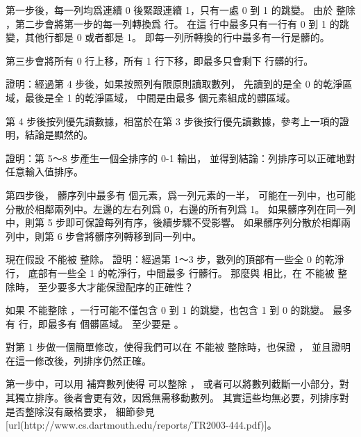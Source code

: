 \startANSWER
第一步後，每一列均爲連續 0 後緊跟連續 1，只有一處 0 到 1 的跳變。
由於  整除 ，第二步會將第一步的每一列轉換爲  行。
在這  行中最多只有一行有 0 到 1 的跳變，其他行都是 0 或者都是 1。
即每一列所轉換的行中最多有一行是髒的。

第三步會將所有 0 行上移，所有 1 行下移，即最多只會剩下  行髒的行。
\stopANSWER

\startitem
證明：經過第 4 步後，如果按照列有限原則讀取數列，
先讀到的是全 0 的乾淨區域，最後是全 1 的乾淨區域，
中間是由最多  個元素組成的髒區域。
\stopitem

\startANSWER
第 4 步後按列優先讀數據，相當於在第 3 步後按行優先讀數據，參考上一項的證明，結論是顯然的。
\stopANSWER

\startitem
證明：第 5～8 步產生一個全排序的 0-1 輸出，
並得到結論：列排序可以正確地對任意輸入值排序。
\stopitem

\startANSWER
第四步後， 髒序列中最多有  個元素，爲一列元素的一半，
可能在一列中，也可能分散於相鄰兩列中。左邊的左右列爲 0，右邊的所有列爲 1。
如果髒序列在同一列中，則第 5 步即可保證每列有序，後續步驟不受影響。
如果髒序列分散於相鄰兩列中，則第 6 步會將髒序列轉移到同一列中。
\stopANSWER

\startitem
現在假設  不能被  整除。
證明：經過第 1～3 步，數列的頂部有一些全 0 的乾淨行，
底部有一些全 1 的乾淨行，中間最多  行髒行。
那麼與  相比，在  不能被  整除時，  至少要多大才能保證配序的正確性？
\stopitem

\startANSWER
如果  不能整除 ，一行可能不僅包含 0 到 1 的跳變，也包含 1 到 0 的跳變。
最多有   行，即最多有  個髒區域。
  至少要是 。
\stopANSWER

\startitem
對第 1 步做一個簡單修改，使得我們可以在  不能被  整除時，也保證 ，
並且證明在這一修改後，列排序仍然正確。
\stopitem

\startANSWER
第一步中，可以用 \m{+\infty} 補齊數列使得  可以整除 ，
或者可以將數列截斷一小部分，對其獨立排序。後者會更有效，因爲無需移動數列。
其實這些均無必要，列排序對是否整除沒有嚴格要求，
細節參見[url(http://www.cs.dartmouth.edu/reports/TR2003-444.pdf)]。
\stopANSWER
\stopigBase

\stopPROBLEM

\stopsubject
